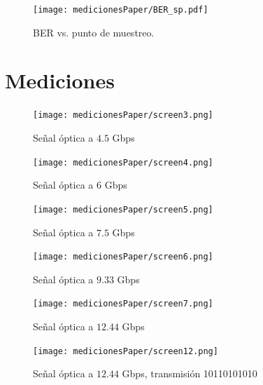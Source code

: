 \documentclass[a4paper,10pt]{report}
\begin{document}
\begin{figure}[t]
  \centering
    \texttt{[image: medicionesPaper/BER\_sp.pdf]}
\caption {BER vs. punto de muestreo.}
\label{fig:BER}
\end{figure}
\section{Mediciones}
\begin{figure}[!t]
  \centering
  \texttt{[image: medicionesPaper/screen3.png]}
  \caption {Señal óptica a $4.5$ Gbps}
  \label{fig:Img1}
\end{figure}

\begin{figure}[!t]
  \centering
 \texttt{[image: medicionesPaper/screen4.png]}
  \caption {Señal óptica a $6$ Gbps}
  \label{fig:Img2}
\end{figure}

\begin{figure}[!t]
  \centering
 \texttt{[image: medicionesPaper/screen5.png]}
  \caption {Señal óptica a $7.5$ Gbps}
  \label{fig:Img3}
\end{figure}


\begin{figure}[!t]
  \centering
 \texttt{[image: medicionesPaper/screen6.png]}
  \caption {Señal óptica a $9.33$ Gbps}
  \label{fig:Img4}
\end{figure}


\begin{figure}[!t]
  \centering
 \texttt{[image: medicionesPaper/screen7.png]}
  \caption {Señal óptica a $12.44$ Gbps}
  \label{fig:Img5}
\end{figure}



\begin{figure}[!t]
  \centering
  \texttt{[image: medicionesPaper/screen12.png]}
  \caption {Señal óptica a $12.44$ Gbps, transmisión 10110101010}
  \label{fig:Img6}
\end{figure}
\end{document}
